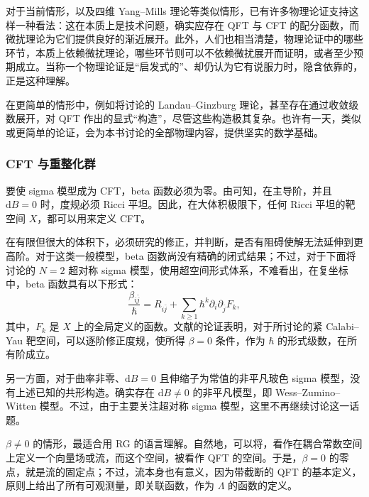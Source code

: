 对于当前情形，以及四维 Yang--Mills 理论等类似情形，已有许多物理论证支持这样一种看法：这在本质上是技术问题，确实应存在 QFT 与 CFT 的配分函数，而微扰理论为它们提供良好的渐近展开。此外，人们也相当清楚，物理论证中的哪些环节，本质上依赖微扰理论，哪些环节则可以不依赖微扰展开而证明，或者至少预期成立。当称一个物理论证是“启发式的”、却仍认为它有说服力时，隐含依靠的，正是这种理解。

在更简单的情形中，例如将讨论的 Landau--Ginzburg 理论，甚至存在通过收敛级数展开，对 QFT 作出的显式“构造”，尽管这些构造极其复杂。也许有一天，类似或更简单的论证，会为本书讨论的全部物理内容，提供坚实的数学基础。

\subsubsection{CFT 与重整化群}\label{sec:3.2.6.2}

要使 sigma 模型成为 CFT，beta 函数必须为零。由可知，在主导阶，并且 $\mathrm{d}B=0$ 时，度规必须 Ricci 平坦。因此，在大体积极限下，任何 Ricci 平坦的靶空间 $X$，都可以用来定义 CFT。

在有限但很大的体积下，必须研究的修正，并判断，是否有阻碍使解无法延伸到更高阶。对于这类一般模型，beta 函数尚没有精确的闭式结果；不过，对于下面将讨论的 $N=2$ 超对称 sigma 模型，使用超空间形式体系，不难看出，在复坐标中，beta 函数具有以下形式：
\[
\frac{\beta_{i\bar j}}{\hbar}
=R_{i\bar j}+\sum_{k\ge1}\hbar^k
\partial_i\partial_{\bar j}F_k,
\]
其中，$F_k$ 是 $X$ 上的全局定义的函数。文献的论证表明，对于所讨论的紧 Calabi--Yau 靶空间，可以逐阶修正度规，使所得 $\beta=0$ 条件，作为 $\hbar$ 的形式级数，在所有阶成立。

另一方面，对于曲率非零、$\mathrm{d}B=0$ 且伸缩子为常值的非平凡玻色 sigma 模型，没有上述已知的共形构造。确实存在 $\mathrm{d}B\ne0$ 的非平凡模型，即 Wess--Zumino--Witten 模型。不过，由于主要关注超对称 sigma 模型，这里不再继续讨论这一话题。

$\beta\ne0$ 的情形，最适合用 RG 的语言理解。自然地，可以将，看作在耦合常数空间上定义一个向量场或流，而这个空间，被看作 QFT 的空间。于是，$\beta=0$ 的零点，就是流的固定点；不过，流本身也有意义，因为带截断的 QFT 的基本定义，原则上给出了所有可观测量，即关联函数，作为 $\Lambda$ 的函数的定义。

